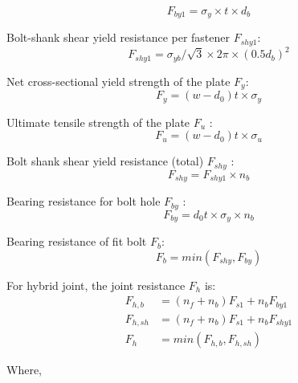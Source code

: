 \begin{equation}
    \label{eq-fdb1}
    F_{by1} = \sigma_y \times t \times d_b
\end{equation}

Bolt-shank shear yield resistance per fastener $F_{shy1}$:
\begin{equation}
    \label{eq-fdsy1}
    F_{shy1} = \sigma_{yb} / \sqrt{3} \times 2 \pi \times (0.5d_b)^2
\end{equation}

Net cross-sectional yield strength of the plate $F_y$:
\begin{equation}
    \label{eq-fdy}
    F_{y} = (w-d_0)t \times \sigma_y
\end{equation}

Ultimate tensile strength of the plate $F_u$ :
\begin{equation}
    \label{eq-fdu}
    F_{u} = (w-d_0)t \times \sigma_u
\end{equation}

Bolt shank shear yield resistance (total) $F_{shy}$ :
\begin{equation}
    \label{eq-fdsy}
    F_{shy} = F_{shy1} \times n_b
\end{equation}

Bearing resistance for bolt hole $F_{by}$ :
\begin{equation}
    F_{by} = d_0 t \times \sigma_{y} \times n_b
\end{equation}

Bearing resistance of fit bolt $F_b$:
\begin{equation}
    F_b = min(F_{shy}, F_{by})
\end{equation}

For hybrid joint, the joint resistance $F_{h}$ \cite{chen2023mecha} is:
\begin{equation} \label{eq-fh}
\begin{aligned}
    F_{h,b} &= (n_f+n_b) F_{s1} + n_b F_{by1} \\
    F_{h,sh} &= (n_f+n_b) F_{s1} + n_b F_{shy1} \\
    F_{h} &= min(F_{h,b}, F_{h,sh})
\end{aligned}    
\end{equation}

Where,

